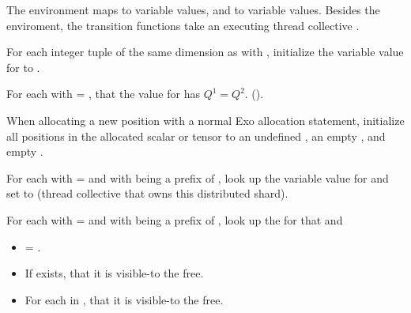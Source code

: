 The environment maps  to  variable values, and  to  variable values.
Besides the enviroment, the transition functions take an executing thread collective .

\filbreak
{} For each integer tuple  of the same dimension as  with , initialize the variable value for  to .

\filbreak
{} For each  with  = ,  that the  value for  has $Q^1 = Q^2$. ().

\filbreak
{} When allocating a new position with a normal Exo allocation statement, initialize all positions in the allocated scalar or tensor to an undefined , an empty , and empty .

\filbreak
{} For each  with  =  and with  being a prefix of , look up the  variable value for  and set  to  (thread collective that owns this distributed shard).

\filbreak
{} For each  with  =  and with  being a prefix of , look up the  for that  and
\begin{itemize}
  \item {}  = .
  \filbreak
  \item If  exists,  that it is visible-to the free.
  \filbreak
  \item For each  in ,  that it is visible-to the free.
\end{itemize}

